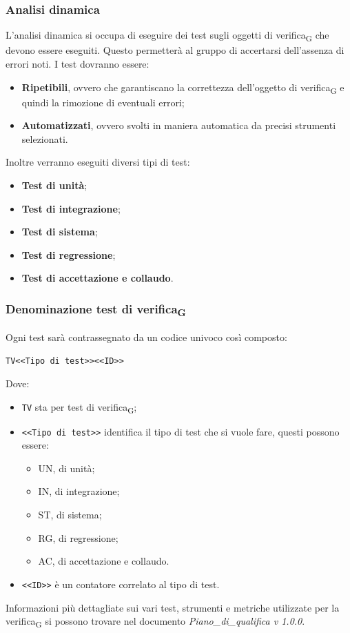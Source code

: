 \subsubsection{Analisi dinamica}
L'analisi dinamica si occupa di eseguire dei test sugli oggetti di verifica\textsubscript{G} che devono essere eseguiti. Questo permetterà al gruppo di accertarsi dell'assenza di errori noti.
I test dovranno essere:
\begin{itemize}
	\item \textbf{Ripetibili}, ovvero che garantiscano la correttezza dell'oggetto di verifica\textsubscript{G} e quindi la rimozione di eventuali errori;
	\item \textbf{Automatizzati}, ovvero svolti in maniera automatica da precisi strumenti selezionati.
\end{itemize}
Inoltre verranno eseguiti diversi tipi di test:
\begin{itemize}
	\item \textbf{Test di unità};
	\item \textbf{Test di integrazione};
	\item \textbf{Test di sistema};
	\item \textbf{Test di regressione};
	\item \textbf{Test di accettazione e collaudo}.
\end{itemize}
\subsubsection{Denominazione test di verifica\textsubscript{G}}
Ogni test sarà contrassegnato da un codice univoco così composto:
\begin{center}
	\verb|TV<<Tipo di test>><<ID>>|
\end{center}
Dove:
\begin{itemize}
	\item \verb|TV| sta per test di verifica\textsubscript{G};
	\item \verb|<<Tipo di test>>| identifica il tipo di test che si vuole fare, questi possono essere:
	\begin{itemize}
		\item UN, di unità;
		\item IN, di integrazione;
		\item ST, di sistema;
		\item RG, di regressione;
		\item AC, di accettazione e collaudo.
	\end{itemize}
	\item \verb|<<ID>>| è un contatore correlato al tipo di test.
\end{itemize}
Informazioni più dettagliate sui vari test, strumenti e metriche utilizzate per la verifica\textsubscript{G} si possono trovare nel documento \textit{Piano\_di\_qualifica v 1.0.0}.


